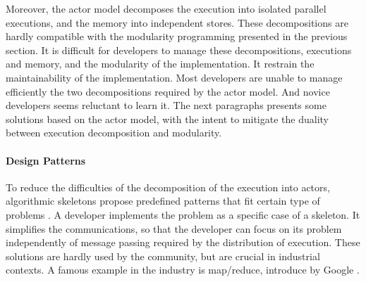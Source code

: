 Moreover, the actor model decomposes the execution into isolated parallel executions, and the memory into independent stores.
These decompositions are hardly compatible with the modularity programming presented in the previous section.
It is difficult for developers to manage these decompositions, executions and memory, and the modularity of the implementation.
It restrain the maintainability of the implementation.
Most developers are unable to manage efficiently the two decompositions required by the actor model.
And novice developers seems reluctant to learn it.
The next paragraphs presents some solutions based on the actor model, with the intent to mitigate the duality between execution decomposition and modularity.

\paragraph{Design Patterns}

To reduce the difficulties of the decomposition of the execution into actors, algorithmic skeletons propose predefined patterns that fit certain type of problems \cite{Cole1988, Dean2008, McCool2010, Gonzalez-Velez2010}.
A developer implements the problem as a specific case of a skeleton.
It simplifies the communications, so that the developer can focus on its problem independently of message passing required by the distribution of execution.
These solutions are hardly used by the community, but are crucial in industrial contexts.
A famous example in the industry is map/reduce, introduce by Google \cite{Dean2008}.



